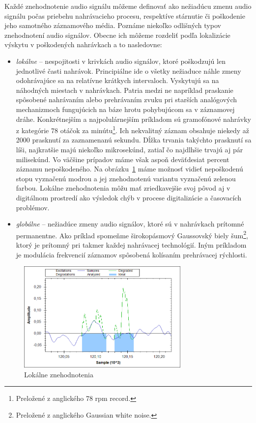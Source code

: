 Každé znehodnotenie audio signálu môžeme definovať ako nežiadúcu zmenu audio signálu počas priebehu nahrávacieho procesu, respektíve stárnutie či poškodenie jeho samotného záznamového média. Poznáme niekoľko odlišných typov znehodnotení audio signálov. Obecne ich môžeme rozdeliť podľa lokalizácie výskytu v poškodených nahrávkach a to nasledovne: 
\begin{itemize}
	\item \textit{lokálne} -- nespojitosti v krivkách audio signálov, ktoré poškodzujú len jednotlivé časti nahrávok. Principiálne ide o všetky nežiaduce náhle zmeny odohrávajúce sa na relatívne krátkych intervaloch. Vyskytujú sa na náhodných miestach v nahrávkach. Patria medzi ne napríklad praskanie spôsobené nahrávaním alebo prehrávaním zvuku pri starších analógových mechanizmoch fungujúcich na báze hrotu pohybujúcom sa v záznamovej dráhe. Konkrétnejším a najpolulárnejším príkladom sú gramofónové nahrávky z kategórie 78 otáčok za minútu\footnote{Preložené z anglického 78 rpm record.}. Ich nekvalitný záznam obsahuje niekedy až 2000 prasknutí za zaznamenanú sekundu. Dĺžka trvania takýchto prasknutí sa líši, najkratšie majú niekoľko mikrosekúnd, zatiaľ čo najdlhšie trvajú aj pár milisekúnd. Vo väčšine prípadov máme však aspoň deväťdesiat percent záznamu nepoškodeného. Na obrázku~\ref{obrazok:lokalne-znehodnotenia} máme možnosť vidieť nepoškodenú stopu vyznačenú modrou a jej znehodnotenú variantu vyznačenú zelenou farbou. Lokálne znehodnotenia môžu mať zriedkavejšie svoj pôvod aj v digitálnom prostredí ako výsledok chýb v procese digitalizácie a časovacích problémov.
	\item \textit{globálne} -- nežiadúce zmeny audio signálov, ktoré sú v nahrávkach prítomné permanentne. Ako príklad spomeňme širokopásmový Gaussovský biely šum\footnote{Preložené z anglického Gaussian white noise.}, ktorý je prítomný pri takmer každej nahrávacej technológií. Iným príkladom je modulácia frekvencií záznamov spôsobená kolísaním prehrávacej rýchlosti.
\end{itemize}

\begin{figure}[!h]
	\centering
	\includegraphics[width=0.75\textwidth]{images/znehodnotenia.png}
	\caption{Lokálne znehodnotenia}
	\label{obrazok:lokalne-znehodnotenia}
\end{figure}

